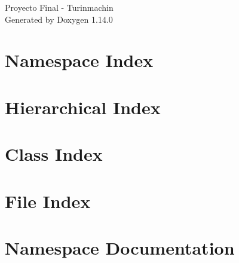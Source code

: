 \documentclass[twoside]{book}
\newcommand{\+}{\discretionary{\mbox{\scriptsize$\hookleftarrow$}}{}{}}
\newcommand{\clearemptydoublepage}{%
    \newpage{\pagestyle{empty}\cleardoublepage}%
  }
\begin{document}
  \raggedbottom
    \hypersetup{pageanchor=false,
                bookmarksnumbered=true,
                pdfencoding=unicode
               }
  \begin{titlepage}
  \vspace*{7cm}
  \begin{center}%
  {\Large Proyecto Final -\/ Turinmachin}\\
  \vspace*{1cm}
  {\large Generated by Doxygen 1.14.0}\\
  \end{center}
  \end{titlepage}
  \clearemptydoublepage
  \tableofcontents
  \clearemptydoublepage
  \hypersetup{pageanchor=true}

\chapter{Namespace Index}

\chapter{Hierarchical Index}

\chapter{Class Index}

\chapter{File Index}

\chapter{Namespace Documentation}























\end{document}

